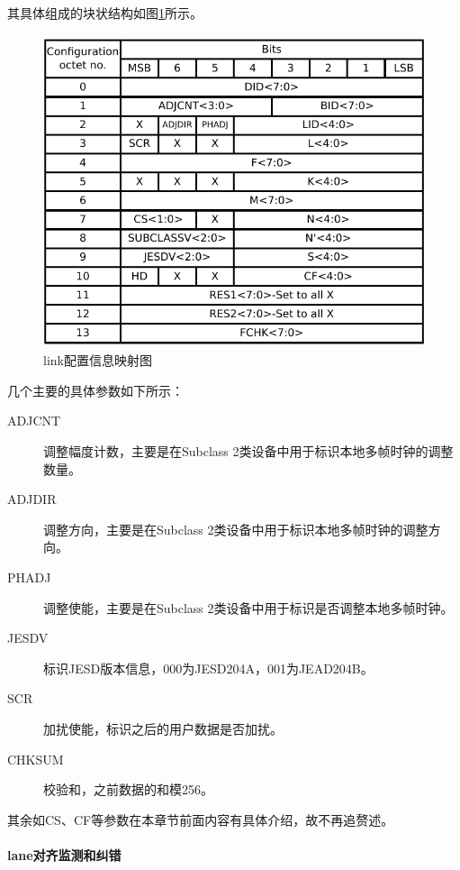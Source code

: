 \documentclass[UTF8]{ctexart}
\begin{document}
其具体组成的块状结构如图\ref{fig:mapping_link_configuration_fields}所示。

\begin{figure}[H]
	\centering
	\includegraphics[width=16cm]{./img/mapping_link_configuration_fields.pdf}
	\caption{link配置信息映射图}
	\label{fig:mapping_link_configuration_fields}
\end{figure}

几个主要的具体参数如下所示：

\begin{description}
  \item[ADJCNT] 调整幅度计数，主要是在Subclass 2类设备中用于标识本地多帧时钟的调整数量。
  \item[ADJDIR] 调整方向，主要是在Subclass 2类设备中用于标识本地多帧时钟的调整方向。
  \item[PHADJ] 调整使能，主要是在Subclass 2类设备中用于标识是否调整本地多帧时钟。
  \item[JESDV] 标识JESD版本信息，000为JESD204A，001为JEAD204B。
  \item[SCR] 加扰使能，标识之后的用户数据是否加扰。
  \item[CHKSUM] 校验和，之前数据的和模256。
\end{description}

其余如CS、CF等参数在本章节前面内容有具体介绍，故不再追赘述。

\paragraph{lane对齐监测和纠错}
\end{document}
